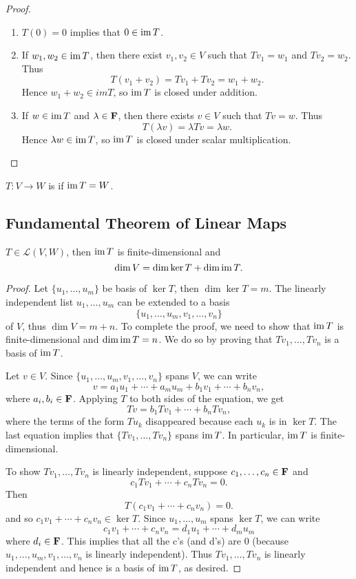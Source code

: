 \begin{proof} \
\begin{enumerate}[label=(\roman*)]
\item $T(0)=0$ implies that $0\in\operatorname{im} T$.
\item If $w_1,w_2\in\operatorname{im} T$, then there exist $v_1,v_2\in V$ such that $Tv_1=w_1$ and $Tv_2=w_2$. Thus
\[T(v_1+v_2)=Tv_1+Tv_2=w_1+w_2.\]
Hence $w_1+w_2\in im T$, so $\operatorname{im} T$ is closed under addition.
\item If $w\in\operatorname{im} T$ and $\lambda\in\mathbf F$, then there exists $v\in V$ such that $Tv=w$. Thus
\[T(\lambda v)=\lambda Tv=\lambda w.\]
Hence $\lambda w\in\operatorname{im} T$, so $\operatorname{im} T$ is closed under scalar multiplication.
\end{enumerate}
\end{proof}

\begin{definition}[Surjectivity]
$T:V\to W$ is  if $\operatorname{im} T=W$.
\end{definition}

\subsection{Fundamental Theorem of Linear Maps}
\begin{theorem}
$T\in\mathcal{L}(V,W)$, then $\operatorname{im} T$ is finite-dimensional and
\begin{equation}
\dim V=\dim\ker T+\dim\operatorname{im} T.
\end{equation}
\end{theorem}

\begin{proof}
Let $\{u_1,\dots,u_m\}$ be basis of $\ker T$, then $\dim\ker T=m$. The linearly independent list $u_1,\dots,u_m$ can be extended to a basis
\[\{u_1,\dots,u_m,v_1,\dots,v_n\}\]
of $V$, thus $\dim V=m+n$. To complete the proof, we need to show that $\operatorname{im} T$ is finite-dimensional and $\dim\operatorname{im} T=n$. We do so by proving that $Tv_1,\dots,Tv_n$ is a basis of $\operatorname{im} T$.

Let $v\in V$. Since $\{u_1,\dots,u_m,v_1,\dots,v_n\}$ spans $V$, we can write
\[v=a_1u_1+\cdots+a_mu_m+b_1v_1+\cdots+b_nv_n,\]
where $a_i,b_i\in\mathbf F$. Applying $T$ to both sides of the equation, we get
\[Tv=b_1Tv_1+\cdots+b_nTv_n,\]
where the terms of the form $Tu_k$ disappeared because each $u_k$ is in $\ker T$. The last equation implies that $\{Tv_1,\dots,Tv_n\}$ spans $\operatorname{im} T$. In particular, $\operatorname{im} T$ is finite-dimensional.

To show $Tv_1,\dots,Tv_n$ is linearly independent, suppose $c_1,\dots,c_n\in\mathbf F$ and
\[c_1Tv_1+\cdots+c_nTv_n=0.\]
Then
\[T(c_1v_1+\cdots+c_nv_n)=0.\]
and so $c_1v_1+\cdots+c_nv_n\in\ker T$. Since $u_1,\dots,u_m$ spans $\ker T$, we can write
\[c_1v_1+\cdots+c_nv_n=d_1u_1+\cdots+d_mu_m\]
where $d_i\in\mathbf F$. This implies that all the c's (and d's) are $0$ (because $u_1,\dots,u_m,v_1,\dots,v_n$ is linearly independent). Thus $Tv_1,\dots,Tv_n$ is linearly independent and hence is a basis of $\operatorname{im} T$, as desired.
\end{proof}

